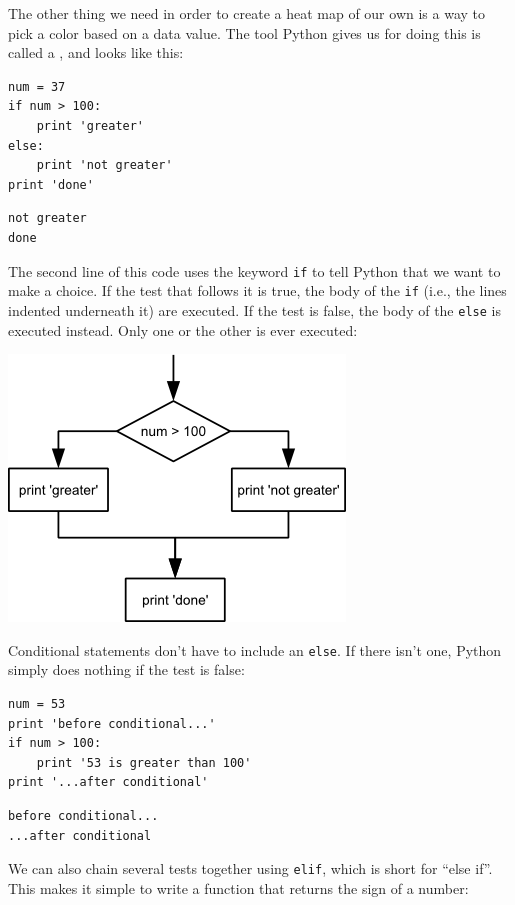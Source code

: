 \documentclass{book}
\begin{document}
The other thing we need in order to create a heat map of our own is a
way to pick a color based on a data value. The tool Python gives us for
doing this is called a , and looks like this:

\begin{verbatim}
num = 37
if num > 100:
    print 'greater'
else:
    print 'not greater'
print 'done'
\end{verbatim}

\begin{verbatim}
not greater
done
\end{verbatim}

The second line of this code uses the keyword \texttt{if} to tell Python
that we want to make a choice. If the test that follows it is true, the
body of the \texttt{if} (i.e., the lines indented underneath it) are
executed. If the test is false, the body of the \texttt{else} is
executed instead. Only one or the other is ever executed:

\includegraphics{novice/python/img/python-flowchart-conditional.png}

Conditional statements don't have to include an \texttt{else}. If there
isn't one, Python simply does nothing if the test is false:

\begin{verbatim}
num = 53
print 'before conditional...'
if num > 100:
    print '53 is greater than 100'
print '...after conditional'
\end{verbatim}

\begin{verbatim}
before conditional...
...after conditional
\end{verbatim}

We can also chain several tests together using \texttt{elif}, which is
short for ``else if''. This makes it simple to write a function that
returns the sign of a number:
\end{document}
